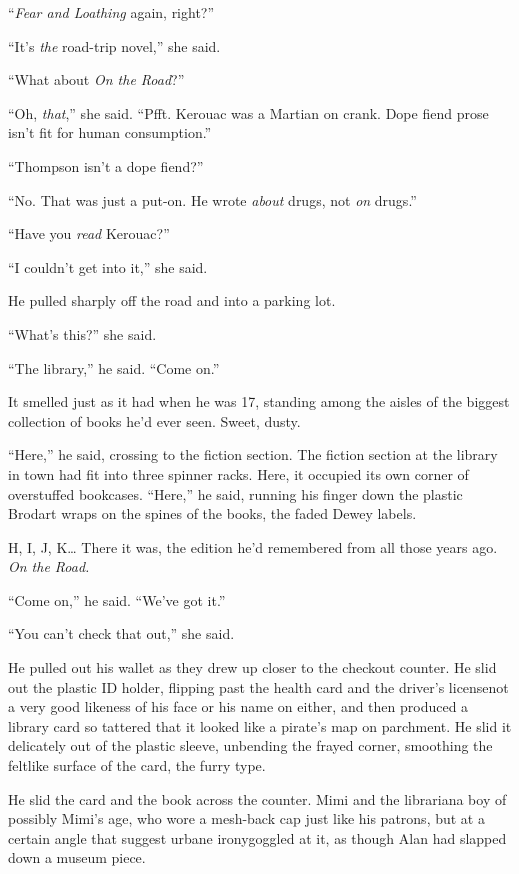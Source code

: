 ``\textit{Fear and Loathing} again, right?''

``It's \textit{the} road-trip novel,'' she said.

``What about \textit{On the Road}?''

``Oh, \textit{that},'' she said.  ``Pfft.  Kerouac was a Martian on
crank.  Dope fiend prose isn't fit for human consumption.''

``Thompson isn't a dope fiend?''

``No.  That was just a put-on.  He wrote \textit{about} drugs, not
\textit{on} drugs.''

``Have you \textit{read} Kerouac?''

``I couldn't get into it,'' she said.

He pulled sharply off the road and into a parking lot.

``What's this?'' she said.

``The library,'' he said.  ``Come on.''

It smelled just as it had when he was 17, standing among the aisles of
the biggest collection of books he'd ever seen.  Sweet, dusty.

``Here,'' he said, crossing to the fiction section.  The fiction
section at the library in town had fit into three spinner racks. 
Here, it occupied its own corner of overstuffed bookcases.  ``Here,''
he said, running his finger down the plastic Brodart wraps on the
spines of the books, the faded Dewey labels.

H, I, J, K\ldots{}  There it was, the edition he'd remembered from all
those years ago.  \textit{On the Road.}

``Come on,'' he said.  ``We've got it.''

``You can't check that out,'' she said.

He pulled out his wallet as they drew up closer to the checkout
counter.  He slid out the plastic ID holder, flipping past the health
card and the driver's license\dash{}not a very good likeness of his face
or his name on either, and then produced a library card so tattered
that it looked like a pirate's map on parchment.  He slid it
delicately out of the plastic sleeve, unbending the frayed corner,
smoothing the feltlike surface of the card, the furry type.

He slid the card and the book across the counter.  Mimi and the
librarian\dash{}a boy of possibly Mimi's age, who wore a mesh-back cap
just like his patrons, but at a certain angle that suggest urbane
irony\dash{}goggled at it, as though Alan had slapped down a museum piece.

